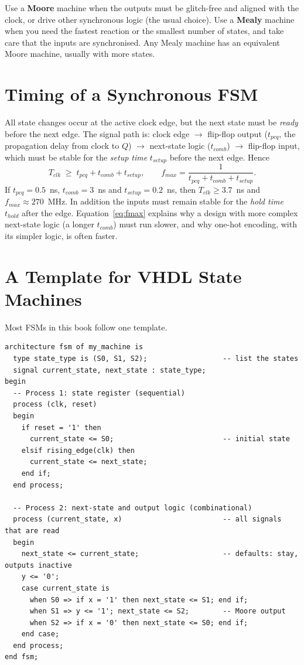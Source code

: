 \begin{keypoint}
Use a \textbf{Moore} machine when the outputs must be glitch-free and aligned with the clock, or drive other synchronous logic (the usual choice). Use a \textbf{Mealy} machine when you need the fastest reaction or the smallest number of states, and take care that the inputs are synchronised. Any Mealy machine has an equivalent Moore machine, usually with more states.
\end{keypoint}

\section{Timing of a Synchronous FSM}\label{sec:fsm-timing}
All state changes occur at the active clock edge, but the next state must be \emph{ready} before the next edge. The signal path is: clock edge $\to$ flip-flop output ($t_{pcq}$, the propagation delay from clock to $Q$) $\to$ next-state logic ($t_{comb}$) $\to$ flip-flop input, which must be stable for the \emph{setup time} $t_{setup}$ before the next edge. Hence
\begin{equation}
  T_{clk} \;\ge\; t_{pcq} + t_{comb} + t_{setup},\qquad f_{max}=\frac{1}{t_{pcq}+t_{comb}+t_{setup}} .
  \label{eq:fmax}
\end{equation}
If $t_{pcq}=0.5$~ns, $t_{comb}=3$~ns and $t_{setup}=0.2$~ns, then $T_{clk}\ge3.7$~ns and $f_{max}\approx270$~MHz. In addition the inputs must remain stable for the \emph{hold time} $t_{hold}$ after the edge. Equation~\eqref{eq:fmax} explains why a design with more complex next-state logic (a longer $t_{comb}$) must run slower, and why one-hot encoding, with its simpler logic, is often faster.

\section{A Template for VHDL State Machines}
Most FSMs in this book follow one template.

\begin{lstlisting}[caption={Template of the two-process FSM description (the state register is process 1 and the combinational logic process 2).},label={lst:fsm-template}]
architecture fsm of my_machine is
  type state_type is (S0, S1, S2);                  -- list the states
  signal current_state, next_state : state_type;
begin
  -- Process 1: state register (sequential)
  process (clk, reset)
  begin
    if reset = '1' then
      current_state <= S0;                          -- initial state
    elsif rising_edge(clk) then
      current_state <= next_state;
    end if;
  end process;

  -- Process 2: next-state and output logic (combinational)
  process (current_state, x)                        -- all signals that are read
  begin
    next_state <= current_state;                    -- defaults: stay, outputs inactive
    y <= '0';
    case current_state is
      when S0 => if x = '1' then next_state <= S1; end if;
      when S1 => y <= '1'; next_state <= S2;        -- Moore output
      when S2 => if x = '0' then next_state <= S0; end if;
    end case;
  end process;
end fsm;
\end{lstlisting}

